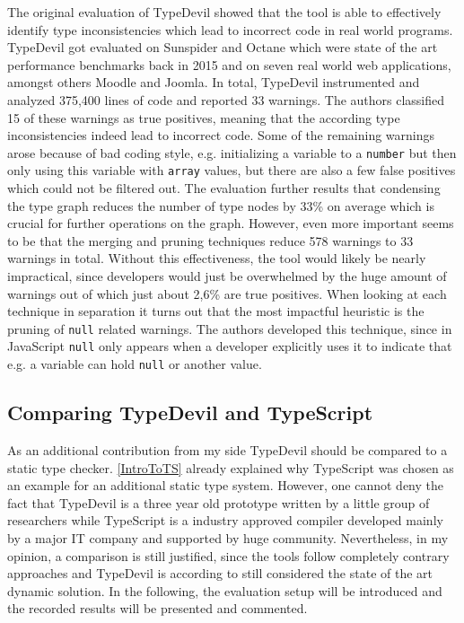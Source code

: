 \documentclass[runningheads,a4paper]{llncs}
\begin{document}
The original evaluation of TypeDevil showed that the tool is able to effectively identify type inconsistencies which lead to incorrect code in real world programs.
TypeDevil got evaluated on Sunspider and Octane which were state of the art performance benchmarks back in 2015 and on seven real world web applications, amongst others Moodle and Joomla.
In total, TypeDevil instrumented and analyzed 375,400 lines of code and reported 33 warnings.
The authors classified 15 of these warnings as true positives, meaning that the according type inconsistencies indeed lead to incorrect code.
Some of the remaining warnings arose because of bad coding style, e.g. initializing a variable to a \lstinline[columns=fixed]{number} but then only using this variable with \lstinline[columns=fixed]{array} values, but there are also a few false positives which could not be filtered out.
The evaluation further results that condensing the type graph reduces the number of type nodes by 33\% on average which is crucial for further operations on the graph.
However, even more important seems to be that the merging and pruning techniques reduce 578 warnings to 33 warnings in total.
Without this effectiveness, the tool would likely be nearly impractical, since developers would just be overwhelmed by the huge amount of warnings out of which just about 2,6\% are true positives. 
When looking at each technique in separation it turns out that the most impactful heuristic is the pruning of \lstinline[columns=fixed]{null} related warnings. 
The authors developed this technique, since in JavaScript \lstinline[columns=fixed]{null} only appears when a developer explicitly uses it to indicate that e.g. a variable can hold \lstinline[columns=fixed]{null} or another value.

\subsection{Comparing TypeDevil and TypeScript} \label{comparison}
As an additional contribution from my side TypeDevil should be compared to a static type checker.
\ref{IntroToTS} already explained why TypeScript was chosen as an example for an additional static type system.
However, one cannot deny the fact that TypeDevil is a three year old prototype written by a little group of researchers while TypeScript is a industry approved compiler developed mainly by a major IT company and supported by huge community.
Nevertheless, in my opinion, a comparison is still justified, since the tools follow completely contrary approaches and TypeDevil is according to \cite{DBLP:conf/icse/TanXCLYS17} still considered the state of the art dynamic solution.
In the following, the evaluation setup will be introduced and the recorded results will be presented and commented. 
\end{document}
